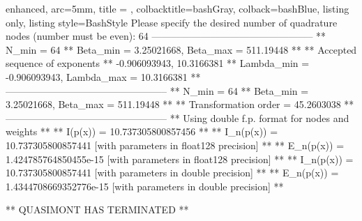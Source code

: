\documentclass[a4paper, twosided]{book}
\begin{document}
\newpage
\begin{tcblisting}{enhanced,
                   arc=5mm,
                   title = \color{black}{\large \ttfamily Building and executing the test driver: p\_2(x)},
                   colbacktitle=bashGray,
                   colback=bashBlue,
                   listing only,
                   listing style=BashStyle}
Please specify the desired number of quadrature nodes (number must be even): 64
 --------------------------------------------------
 ** N_min = 64
 ** Beta_min = 3.25021668, Beta_max = 511.19448 **
 ** Accepted sequence of exponents ** 
    {-0.906093943, 10.3166381}
 ** Lambda_min = -0.906093943, Lambda_max = 10.3166381 **
 --------------------------------------------------
 ** N_min = 64
 ** Beta_min = 3.25021668, Beta_max = 511.19448 **
 ** Transformation order = 45.2603038 **
 --------------------------------------------------
 ** Using double f.p. format for nodes and weights **
 ** I(p(x))   = 10.737305800857456 **
 ** I_n(p(x)) = 10.737305800857441     [with parameters in float128 precision] **
 ** E_n(p(x)) = 1.424785764850455e-15  [with parameters in float128 precision] **
 ** I_n(p(x)) = 10.737305800857441     [with parameters in double precision] **
 ** E_n(p(x)) = 1.4344708669352776e-15 [with parameters in double precision] **

 ** QUASIMONT HAS TERMINATED **
\end{tcblisting}
\end{document}
